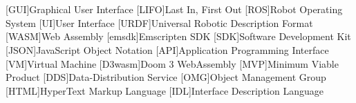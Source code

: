 \chapter*{}



\section*{}
\begin{acronym}[LONGEST]

    [GUI]{Graphical User Interface}
    [LIFO]{Last In, First Out}
    [ROS]{Robot Operating System}
    [UI]{User Interface}
    [URDF]{Universal Robotic Description Format}
    [WASM]{Web Assembly}
    [emsdk]{Emscripten SDK}
    [SDK]{Software Development Kit}
    [JSON]{JavaScript Object Notation}
    [API]{Application Programming Interface}
    [VM]{Virtual Machine}
    [D3wasm]{Doom 3 WebAssembly}
    [MVP]{Minimum Viable Product}
    [DDS]{Data-Distribution Service}
    [OMG]{Object Management Group}
    [HTML]{HyperText Markup Language}
    [IDL]{Interface Description Language}

\end{acronym}







